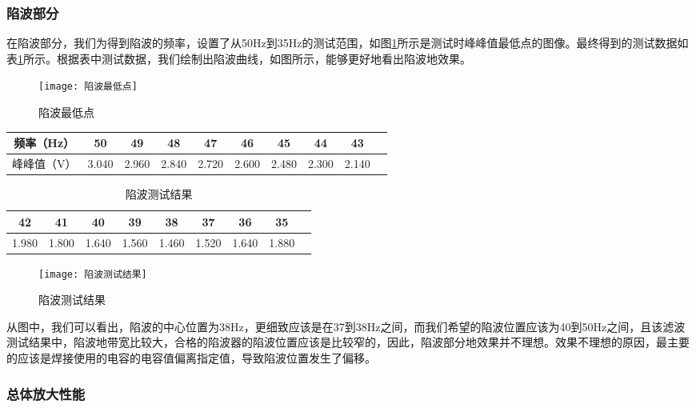 \documentclass{zjureport}
\begin{document}
	\subsubsection{陷波部分}
	
	在陷波部分，我们为得到陷波的频率，设置了从50Hz到35Hz的测试范围，如图\ref{陷波最低点}所示是测试时峰峰值最低点的图像。最终得到的测试数据如表\ref{陷波测试结果}所示。根据表中测试数据，我们绘制出陷波曲线，如图所示，能够更好地看出陷波地效果。
	
	\begin{figure}[H]
		\centering%
		\texttt{[image: 陷波最低点]}
		\caption{陷波最低点}%
		\label{陷波最低点}%
	\end{figure}
	
	\begin{table}[htbp]
		\centering
		\begin{tabular}{ c|c|c|c|c|c|c|c|c p{1.5cm}}
			\hline
			频率（Hz） & 50 & 49 & 48 & 47 & 46 & 45 & 44 & 43  \\
			\hline
			峰峰值（V）  & 3.040 & 2.960 & 2.840 & 2.720 & 2.600 & 2.480 & 2.300 & 2.140 \\
			\hline
		\end{tabular}
	\end{table}

	\begin{table}[H]
		\centering
		\begin{tabular}{ c|c|c|c|c|c|c|c p{1.5cm}}
			\hline
			 42 & 41 & 40 & 39 & 38 & 37 & 36 & 35  \\
			\hline
			 1.980 & 1.800 & 1.640 & 1.560 & 1.460 & 1.520 & 1.640 & 1.880 \\
			\hline
		\end{tabular}
		\caption{陷波测试结果}\label{陷波测试结果}
	\end{table}

	\begin{figure}[H]
		\centering%
		\texttt{[image: 陷波测试结果]}
		\caption{陷波测试结果}%
		\label{陷波测试结果图}%
	\end{figure}

	从图中，我们可以看出，陷波的中心位置为38Hz，更细致应该是在37到38Hz之间，而我们希望的陷波位置应该为40到50Hz之间，且该滤波测试结果中，陷波地带宽比较大，合格的陷波器的陷波位置应该是比较窄的，因此，陷波部分地效果并不理想。效果不理想的原因，最主要的应该是焊接使用的电容的电容值偏离指定值，导致陷波位置发生了偏移。
	
	\subsubsection{总体放大性能}
	
\end{document}
